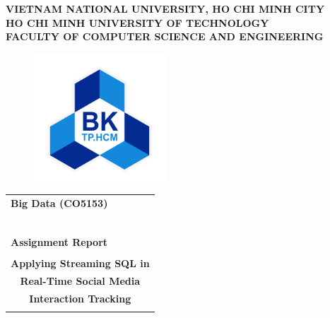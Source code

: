 \documentclass[12pt, a4paper]{article}
\begin{document}
\begin{titlepage}

    \begin{center}
        \large \textbf{VIETNAM NATIONAL UNIVERSITY, HO CHI MINH CITY} \\
        \large \textbf{HO CHI MINH UNIVERSITY OF TECHNOLOGY} \\
        \large \textbf{FACULTY OF COMPUTER SCIENCE AND ENGINEERING}
    \end{center}

    \begin{figure}[h!]
        \begin{center}
            \includegraphics[width=5cm]{Images/hcmut.png}
        \end{center}
    \end{figure}

    \begin{center}
        \begin{tabular}{c}
        \multicolumn{1}{l}{\textbf{{\Large Big Data (CO5153)}}}\\
        ~~\\
        \hline
        \\
        \multicolumn{1}{l}{\textbf{{\Large Assignment Report}}}\\
        \\
        \textbf{{\Huge Applying Streaming SQL in}}\\
        \textbf{{\Huge Real-Time Social Media}}\\
        \textbf{{\Huge Interaction Tracking}}\\
        \\
        \hline
        \end{tabular}
        \end{center}


\end{titlepage}
\end{document}
